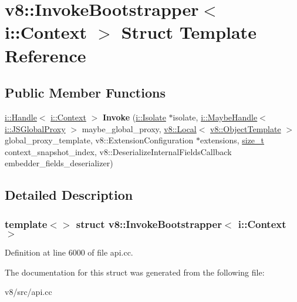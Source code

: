 \hypertarget{structv8_1_1InvokeBootstrapper_3_01i_1_1Context_01_4}{}\section{v8\+:\+:Invoke\+Bootstrapper$<$ i\+:\+:Context $>$ Struct Template Reference}
\label{structv8_1_1InvokeBootstrapper_3_01i_1_1Context_01_4}
\subsection*{Public Member Functions}
\begin{DoxyCompactItemize}
\item 
\mbox{\label{structv8_1_1InvokeBootstrapper_3_01i_1_1Context_01_4_aeeaf736b60ec65b1a04bd83522e7babb}} 
\mbox{\hyperlink{classv8_1_1internal_1_1Handle}{i\+::\+Handle}}$<$ \mbox{\hyperlink{classv8_1_1internal_1_1Context}{i\+::\+Context}} $>$ {\bfseries Invoke} (\mbox{\hyperlink{classv8_1_1internal_1_1Isolate}{i\+::\+Isolate}} $\ast$isolate, \mbox{\hyperlink{classv8_1_1internal_1_1MaybeHandle}{i\+::\+Maybe\+Handle}}$<$ \mbox{\hyperlink{classv8_1_1internal_1_1JSGlobalProxy}{i\+::\+J\+S\+Global\+Proxy}} $>$ maybe\+\_\+global\+\_\+proxy, \mbox{\hyperlink{classv8_1_1Local}{v8\+::\+Local}}$<$ \mbox{\hyperlink{classv8_1_1ObjectTemplate}{v8\+::\+Object\+Template}} $>$ global\+\_\+proxy\+\_\+template, v8\+::\+Extension\+Configuration $\ast$extensions, \mbox{\hyperlink{classsize__t}{size\+\_\+t}} context\+\_\+snapshot\+\_\+index, v8\+::\+Deserialize\+Internal\+Fields\+Callback embedder\+\_\+fields\+\_\+deserializer)
\end{DoxyCompactItemize}


\subsection{Detailed Description}
\subsubsection*{template$<$$>$\newline
struct v8\+::\+Invoke\+Bootstrapper$<$ i\+::\+Context $>$}



Definition at line 6000 of file api.\+cc.



The documentation for this struct was generated from the following file\+:\begin{DoxyCompactItemize}
\item 
v8/src/api.\+cc\end{DoxyCompactItemize}
